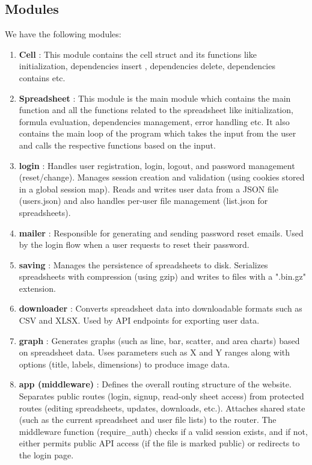 \documentclass[10pt,a4paper]{article}  %
\begin{document}
\subsection{Modules}
We have the following modules:
\begin{enumerate}
    \item \textbf{Cell} : This module contains the cell struct and its functions like initialization, dependencies insert , dependencies delete, dependencies contains etc.

    \item \textbf{Spreadsheet} : This module is the main module which contains the main function and all the functions related to the spreadsheet like initialization, formula evaluation, dependencies management, error handling etc. It also contains the main loop of the program which takes the input from the user and calls the respective functions based on the input.
    \item \textbf{login} : Handles user registration, login, logout, and password management (reset/change). Manages session creation and validation (using cookies stored in a global session map). Reads and writes user data from a JSON file (users.json) and also handles per-user file management (list.json for spreadsheets).
    
    \item \textbf{mailer} : Responsible for generating and sending password reset emails. Used by the login flow when a user requests to reset their password.
    
    \item \textbf{saving} : Manages the persistence of spreadsheets to disk. Serializes spreadsheets with compression (using gzip) and writes to files with a ".bin.gz" extension.
    
    \item \textbf{downloader} : Converts spreadsheet data into downloadable formats such as CSV and XLSX. Used by API endpoints for exporting user data.
    
    \item \textbf{graph} : Generates graphs (such as line, bar, scatter, and area charts) based on spreadsheet data. Uses parameters such as X and Y ranges along with options (title, labels, dimensions) to produce image data.
    
    \item \textbf{app (middleware)} : Defines the overall routing structure of the website. Separates public routes (login, signup, read-only sheet access) from protected routes (editing spreadsheets, updates, downloads, etc.). Attaches shared state (such as the current spreadsheet and user file lists) to the router. The middleware function (require\_auth) checks if a valid session exists, and if not, either permits public API access (if the file is marked public) or redirects to the login page.


\end{enumerate}
\end{document}
